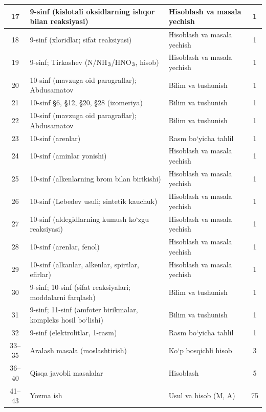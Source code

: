 \documentclass[11pt,a4paper]{article}
\renewcommand{\textsubscript}[1]{\ensuremath{_{\text{\fontsize{8}{8}\selectfont #1}}}}
\begin{document}
{\begin{longtable}{|c|p{7.2cm}|p{5.4cm}|c|}
17 & 9-sinf (kislotali oksidlarning ishqor bilan reaksiyasi) & Hisoblash va masala yechish & 1\\\hline
18 & 9-sinf (xloridlar; sifat reaksiyasi) & Hisoblash va masala yechish & 1\\\hline
19 & 9-sinf; Tirkashev (N/NH\textsubscript{3}/HNO\textsubscript{3}, hisob) & Hisoblash va masala yechish & 1\\\hline
20 & 10-sinf (mavzuga oid paragraflar); Abdusamatov & Bilim va tushunish & 1\\\hline
21 & 10-sinf \S{}6, \S{}12, \S{}20, \S{}28 (izomeriya) & Bilim va tushunish & 1\\\hline
22 & 10-sinf (mavzuga oid paragraflar); Abdusamatov & Bilim va tushunish & 1\\\hline
23 & 10-sinf (arenlar) & Rasm bo`yicha tahlil & 1\\\hline
24 & 10-sinf (aminlar yonishi) & Hisoblash va masala yechish & 1\\\hline
25 & 10-sinf (alkenlarning brom bilan birikishi) & Hisoblash va masala yechish & 1\\\hline
26 & 10-sinf (Lebedev usuli; sintetik kauchuk) & Hisoblash va masala yechish & 1\\\hline
27 & 10-sinf (aldegidlarning kumush ko`zgu reaksiyasi) & Hisoblash va masala yechish & 1\\\hline
28 & 10-sinf (arenlar, fenol) & Hisoblash va masala yechish & 1\\\hline
29 & 10-sinf (alkanlar, alkenlar, spirtlar, efirlar) & Hisoblash va masala yechish & 1\\\hline
30 & 9-sinf; 10-sinf (sifat reaksiyalari; moddalarni farqlash) & Bilim va tushunish & 1\\\hline
31 & 9-sinf; 11-sinf (amfoter birikmalar, kompleks hosil bo`lishi) & Bilim va tushunish & 1\\\hline
32 & 9-sinf (elektrolitlar, 1-rasm) & Rasm bo`yicha tahlil & 1\\\hline
33--35 & Aralash masala (moslashtirish) & Ko`p bosqichli hisob & 3\\\hline
36--40 & Qisqa javobli masalalar & Hisoblash & 5\\\hline
41--43 & Yozma ish & Usul va hisob (M, A) & 75\\\hline
\end{longtable}}
\end{document}
